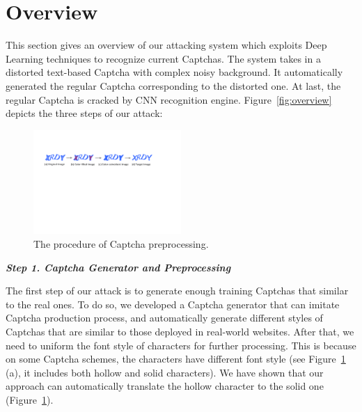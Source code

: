 \section{Overview}

This section gives an overview of our attacking system which exploits Deep Learning techniques to recognize current Captchas. The system takes in a distorted text-based Captcha with complex noisy background. It automatically generated the regular Captcha corresponding to the distorted one. At last, the regular Captcha is cracked by CNN recognition engine. Figure~\ref{fig:overview} depicts the three steps of our attack:

\begin{figure}
  \centering
  \includegraphics[width=0.5\textwidth]{fig/fill_color.pdf}
  \caption{The procedure of Captcha preprocessing.}
  \label{fig:fill_color}
\end{figure}

\noindent \textbf{\emph{Step 1. Captcha Generator and Preprocessing}}

The first step of our attack is to generate enough training Captchas that similar to the real ones. To do so, we developed a Captcha generator that can imitate Captcha production process, and automatically generate different styles of Captchas that are similar to those deployed in real-world websites. After that, we need to uniform the font style of characters for further processing. This is because on some Captcha schemes, the characters have different font style (see Figure~\ref{fig:fill_color} (a), it includes both hollow and solid characters). We have shown that our approach can automatically translate the hollow character to the solid one (Figure~\ref{fig:fill_color}).



